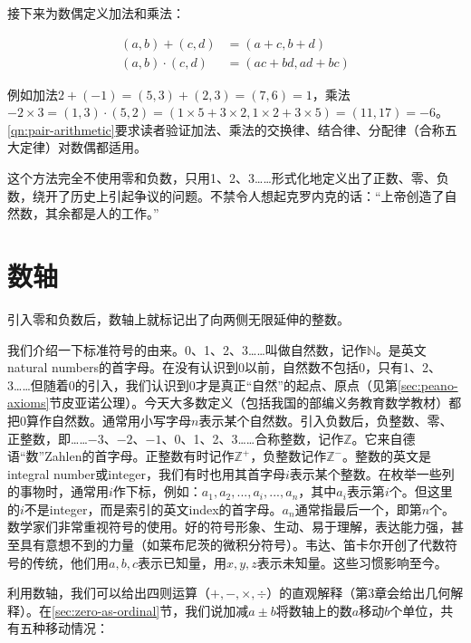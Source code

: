 \documentclass[b5paper]{ctexart}
\begin{document}
接下来为数偶定义加法和乘法：

\begin{align}
(a, b) + (c, d) &= (a + c, b + d) \\
(a, b) \cdot (c, d) &= (ac + bd, ad + bc)
\label{eq:pair-add-mul}
\end{align}

例如加法$2 + (-1) = (5, 3) + (2, 3) = (7, 6) = 1$，乘法$-2 \times 3 = (1, 3) \cdot (5, 2) = (1 \times 5 + 3 \times 2, 1 \times 2 + 3 \times 5) = (11, 17) = -6$。\cref{qn:pair-arithmetic}要求读者验证加法、乘法的交换律、结合律、分配律（合称五大定律）对数偶都适用。

这个方法完全不使用零和负数，只用1、2、3……形式化地定义出了正数、零、负数，绕开了历史上引起争议的问题。不禁令人想起克罗内克的话：“上帝创造了自然数，其余都是人的工作。”

\section{数轴}
引入零和负数后，数轴上就标记出了向两侧无限延伸的整数。

\begin{center}
\end{center}

我们介绍一下标准符号的由来。0、1、2、3……叫做自然数，记作$\mathbb{N}$。是英文natural numbers的首字母。在没有认识到0以前，自然数不包括0，只有1、2、3……但随着0的引入，我们认识到0才是真正“自然”的起点、原点（见第\ref{sec:peano-axioms}节皮亚诺公理）。今天大多数定义（包括我国的部编义务教育数学教材）都把0算作自然数。通常用小写字母$n$表示某个自然数。引入负数后，负整数、零、正整数，即……$-3$、$-2$、$-1$、0、1、2、3……合称整数，记作$\mathbb{Z}$。它来自德语“数”Zahlen的首字母。正整数有时记作$\mathbb{Z}^+$，负整数记作$\mathbb{Z}^-$。整数的英文是integral number或integer，我们有时也用其首字母$i$表示某个整数。在枚举一些列的事物时，通常用$i$作下标，例如：$a_1, a_2, ..., a_i, ..., a_n$，其中$a_i$表示第$i$个。但这里的$i$不是integer，而是索引的英文index的首字母。$a_n$通常指最后一个，即第$n$个。数学家们非常重视符号的使用。好的符号形象、生动、易于理解，表达能力强，甚至具有意想不到的力量（如莱布尼茨的微积分符号）。韦达、笛卡尔开创了代数符号的传统，他们用$a, b, c$表示已知量，用$x, y, z$表示未知量。这些习惯影响至今。

利用数轴，我们可以给出四则运算（$+, -, \times, \div$）的直观解释（第3章会给出几何解释）。在\ref{sec:zero-as-ordinal}节，我们说加减$a \pm b$将数轴上的数$a$移动$b$个单位，共有五种移动情况：
\end{document}

